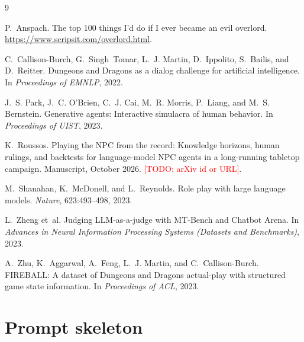 \documentclass[11pt]{article}
\newcommand{\todo}[1]{\textcolor{red}{[TODO: #1]}}
\begin{document}

\begin{thebibliography}{9}

P.~Anspach.
\newblock The top 100 things I'd do if I ever became an evil overlord.
\newblock \url{https://www.scripsit.com/overlord.html}.

C.~Callison-Burch, G.~Singh~Tomar, L.~J. Martin, D.~Ippolito, S.~Bailis, and D.~Reitter.
\newblock Dungeons and Dragons as a dialog challenge for artificial intelligence.
\newblock In \emph{Proceedings of EMNLP}, 2022.

J.~S. Park, J.~C. O'Brien, C.~J. Cai, M.~R. Morris, P.~Liang, and M.~S. Bernstein.
\newblock Generative agents: Interactive simulacra of human behavior.
\newblock In \emph{Proceedings of UIST}, 2023.

K.~Roussos.
\newblock Playing the NPC from the record: Knowledge horizons, human rulings, and backtests
for language-model NPC agents in a long-running tabletop campaign.
\newblock Manuscript, October 2026. \todo{arXiv id or URL}.

M.~Shanahan, K.~McDonell, and L.~Reynolds.
\newblock Role play with large language models.
\newblock \emph{Nature}, 623:493--498, 2023.

L.~Zheng et~al.
\newblock Judging LLM-as-a-judge with MT-Bench and Chatbot Arena.
\newblock In \emph{Advances in Neural Information Processing Systems (Datasets and
Benchmarks)}, 2023.

A.~Zhu, K.~Aggarwal, A.~Feng, L.~J. Martin, and C.~Callison-Burch.
\newblock FIREBALL: A dataset of Dungeons and Dragons actual-play with structured game
state information.
\newblock In \emph{Proceedings of ACL}, 2023.

\end{thebibliography}

\appendix

\section{Prompt skeleton}
\end{document}
